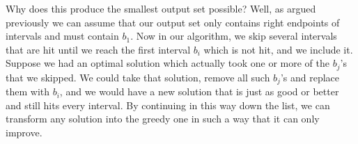 \documentclass[11pt]{article}
\begin{document}
Why does this produce the smallest output set possible?  Well, as
argued previously we can assume that our output set only contains
right endpoints of intervals and must contain $b_1$.  Now in our
algorithm, we skip several intervals that are hit until we reach the
first interval $b_i$ which is not hit, and we include it.  Suppose we
had an optimal solution which actually took one or more of the $b_j$'s
that we skipped.  We could take that solution, remove all such $b_j$'s
and replace them with $b_i$, and we would have a new solution that
is just as good or better and still hits every interval.  By
continuing in this way down the list, we can transform any solution
into the greedy one in such a way that it can only improve.
\end{document}

